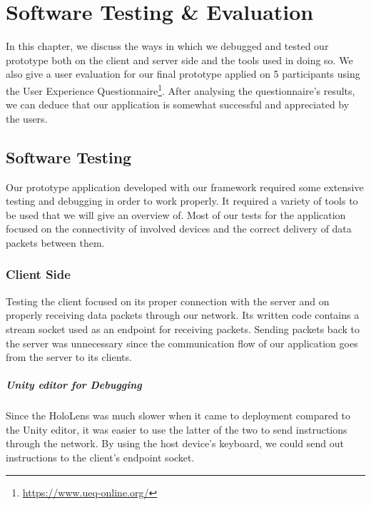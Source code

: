 
\chapter{Software Testing \& Evaluation}
In this chapter, we discuss the ways in which we debugged and tested our prototype both on the client and server side and the tools used in doing so.
We also give a user evaluation for our final prototype applied on 5 participants using the User Experience Questionnaire\footnote{\protect\url{https://www.ueq-online.org/}}. After analysing the questionnaire's results, we can deduce that our application is somewhat successful and appreciated by the users.



\section{Software Testing}
Our prototype application developed with our framework required some extensive testing and debugging in order to work properly. It required a variety of tools to be used that we will give an overview of. Most of our tests for the application focused on the connectivity of involved devices and the correct delivery of data packets between them.

\subsection{Client Side}
Testing the client focused on its proper connection with the server and on properly receiving data packets through our network. Its written code contains a stream socket used as an endpoint for receiving packets. Sending packets back to the server was unnecessary since the communication flow of our application goes from the server to its clients.

\paragraph{Unity editor for Debugging}
Since the HoloLens was much slower when it came to deployment compared to the Unity editor, it was easier to use the latter of the two to send instructions through the network. By using the host device's keyboard, we could send out instructions to the client's endpoint socket. 

